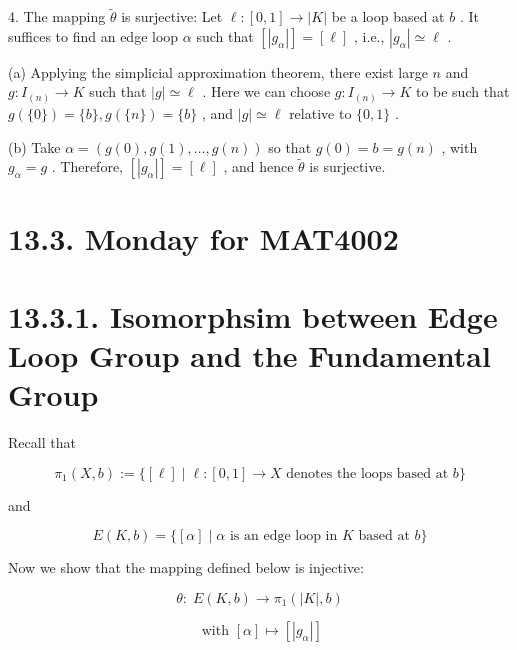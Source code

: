 4. The mapping \(\widetilde{\theta }\) is surjective: Let \(\ell  : \left\lbrack  {0,1}\right\rbrack   \rightarrow  \left| K\right|\) be a loop based at \(b\) . It suffices to find an edge loop \(\alpha\) such that \(\left\lbrack  \left| {g}_{\alpha }\right| \right\rbrack   = \left\lbrack  \ell \right\rbrack\) , i.e., \(\left| {g}_{\alpha }\right|  \simeq  \ell\) .

(a) Applying the simplicial approximation theorem, there exist large \(n\) and \(g : {I}_{\left( n\right) } \rightarrow  K\) such that \(\left| g\right|  \simeq  \ell\) . Here we can choose \(g : {I}_{\left( n\right) } \rightarrow  K\) to be such that \(g\left( {\{ 0\} }\right)  = \{ b\} ,g\left( {\{ n\} }\right)  = \{ b\}\) , and \(\left| g\right|  \simeq  \ell\) relative to \(\{ 0,1\}\) .

(b) Take \(\alpha  = \left( {g\left( 0\right) ,g\left( 1\right) ,\ldots ,g\left( n\right) }\right)\) so that \(g\left( 0\right)  = b = g\left( n\right)\) , with \({g}_{\alpha } = g\) . Therefore, \(\left\lbrack  \left| {g}_{\alpha }\right| \right\rbrack   = \left\lbrack  \ell \right\rbrack\) , and hence \(\widetilde{\theta }\) is surjective.

\section*{13.3. Monday for MAT4002}

\section*{13.3.1. Isomorphsim between Edge Loop Group and the Fundamental Group}

Recall that

\[
{\pi }_{1}\left( {X,b}\right)  \mathrel{\text{ := }} \{ \left\lbrack  \ell \right\rbrack   \mid  \ell  : \left\lbrack  {0,1}\right\rbrack   \rightarrow  X\text{ denotes the loops based at }b\}
\]

and

\[
E\left( {K,b}\right)  = \{ \left\lbrack  \alpha \right\rbrack   \mid  \alpha \text{ is an edge loop in }K\text{ based at }b\}
\]

Now we show that the mapping defined below is injective:

\[
\theta  : \;E\left( {K,b}\right)  \rightarrow  {\pi }_{1}\left( {\left| K\right| ,b}\right)
\]

\[
\text{ with }\left\lbrack  \alpha \right\rbrack   \mapsto  \left\lbrack  \left| {g}_{\alpha }\right| \right\rbrack
\]

